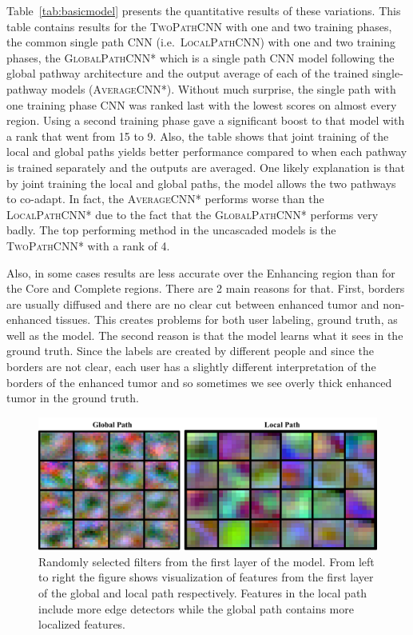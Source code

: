 \documentclass[final,5p,times,twocolumn]{elsarticle}
\begin{document}
Table~\ref{tab:basicmodel} presents the quantitative results of these variations. This table contains results for the \textsc{TwoPathCNN} with one and two training phases, the common single path CNN (i.e.\  \textsc{LocalPathCNN}) with one and two training phases, the \textsc{GlobalPathCNN*} which is a single path CNN model following the global pathway architecture and the output average of each of the trained single-pathway models (\textsc{AverageCNN*}). Without much surprise, the single path with one training phase CNN was ranked last with the lowest scores on almost every region.  Using a second training phase gave a significant boost to that model with a rank that went from 15 to 9. Also, the table shows that joint training of the local and global paths yields better performance compared to when each pathway is trained separately and the outputs are averaged. One likely explanation is that by joint training the local and global paths, the model allows the two pathways to co-adapt. In fact, the \textsc{AverageCNN*} performs worse than the \textsc{LocalPathCNN*} due to the fact that the \textsc{GlobalPathCNN*} performs very badly. The top performing method in the uncascaded models is the \textsc{TwoPathCNN*} with a rank of 4.

Also, in some cases results are less accurate over the Enhancing region than for the Core and Complete regions.  There are 2 main reasons for that.  First, borders are usually diffused and there are no clear cut between enhanced tumor and non-enhanced tissues. This creates problems for both user labeling, ground truth, as well as the model. The second reason is that the model learns what it sees in the ground truth. Since the labels are created by different people and since the borders are not clear, each user has a slightly different interpretation of the borders of the enhanced tumor and so sometimes we see overly thick enhanced tumor in the ground truth.

\begin{figure}

\centering

\includegraphics[width=\linewidth]{features.pdf}

\caption{Randomly selected filters from the first layer of the model. From left to right the figure shows visualization of features from the first layer of the global and local path respectively. Features in the local path include more edge detectors while the global path contains more localized features.}

\label{fig:features}
\end{figure}
\end{document}
